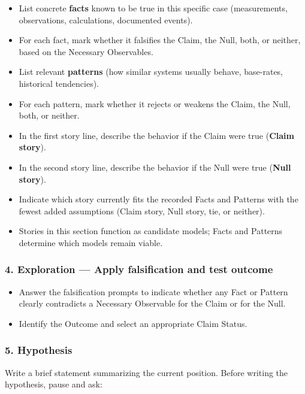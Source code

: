 \documentclass[
  letterpaper,
  DIV=11,
  numbers=noendperiod]{scrartcl}
\providecommand{\tightlist}{%
  \setlength{\itemsep}{0pt}\setlength{\parskip}{0pt}}
\begin{document}
\begin{itemize}
\tightlist
\item
  List concrete \textbf{facts} known to be true in this specific case
  (measurements, observations, calculations, documented events).
\item
  For each fact, mark whether it falsifies the Claim, the Null, both, or
  neither, based on the Necessary Observables.
\item
  List relevant \textbf{patterns} (how similar systems usually behave,
  base-rates, historical tendencies).
\item
  For each pattern, mark whether it rejects or weakens the Claim, the
  Null, both, or neither.
\item
  In the first story line, describe the behavior if the Claim were true
  (\textbf{Claim story}).
\item
  In the second story line, describe the behavior if the Null were true
  (\textbf{Null story}).
\item
  Indicate which story currently fits the recorded Facts and Patterns
  with the fewest added assumptions (Claim story, Null story, tie, or
  neither).
\item
  Stories in this section function as candidate models; Facts and
  Patterns determine which models remain viable.
\end{itemize}

\subsubsection{4. Exploration --- Apply falsification and test
outcome}\label{exploration-apply-falsification-and-test-outcome}

\begin{itemize}
\tightlist
\item
  Answer the falsification prompts to indicate whether any Fact or
  Pattern clearly contradicts a Necessary Observable for the Claim or
  for the Null.
\item
  Identify the Outcome and select an appropriate Claim Status.
\end{itemize}

\subsubsection{5. Hypothesis}\label{hypothesis}

Write a brief statement summarizing the current position. Before writing
the hypothesis, pause and ask:
\end{document}
